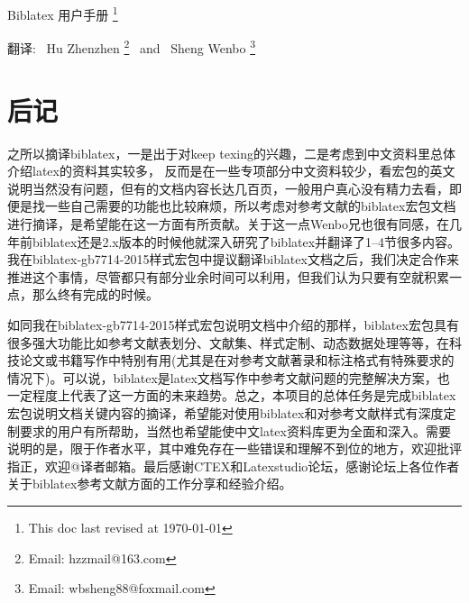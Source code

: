\documentclass{ltxdockit}[2011/03/25]
\begin{document}
\printtitlepage

\begin{trivlist}\item\relax
{\hfill\heiti{}Biblatex 用户手册
\footnote{This doc last revised at \today}\hfill\hspace*{1pt}}\par
{\hfill\fangsong{}翻译:~ Hu Zhenzhen \footnote{Email: hzzmail@163.com} ~and~ %
    	Sheng Wenbo \footnote{Email: wbsheng88@foxmail.com}\hfill\hspace*{2.5cm}}\par
{\hfill\kaiti{}\hfill\hspace*{0.5cm}}\par
\end{trivlist}
\renewcommand{\contentsname}{目录}
\renewcommand{\listtablename}{表格}
\tableofcontents
\listoftables











\printglossary[type=trans,style=longragged3colborder,nopostdot=true,nogroupskip]%

\section{后记}

\setlength{\parskip}{2mm}\setlength{\itemindent}{2em}

之所以摘译biblatex，一是出于对keep texing的兴趣，二是考虑到中文资料里总体介绍latex的资料其实较多，
反而是在一些专项部分中文资料较少，看宏包的英文说明当然没有问题，但有的文档内容长达几百页，一般用户真心没有精力去看，即便是找一些自己需要的功能也比较麻烦，所以考虑对参考文献的biblatex宏包文档进行摘译，是希望能在这一方面有所贡献。关于这一点Wenbo兄也很有同感，在几年前biblatex还是2.x版本的时候他就深入研究了biblatex并翻译了1--4节很多内容。我在biblatex-gb7714-2015样式宏包中提议翻译biblatex文档之后，我们决定合作来推进这个事情，尽管都只有部分业余时间可以利用，但我们认为只要有空就积累一点，那么终有完成的时候。

如同我在biblatex-gb7714-2015样式宏包说明文档中介绍的那样，biblatex宏包具有很多强大功能比如参考文献表划分、文献集、样式定制、动态数据处理等等，在科技论文或书籍写作中特别有用(尤其是在对参考文献著录和标注格式有特殊要求的情况下)。可以说，biblatex是latex文档写作中参考文献问题的完整解决方案，也一定程度上代表了这一方面的未来趋势。总之，本项目的总体任务是完成biblatex宏包说明文档关键内容的摘译，希望能对使用biblatex和对参考文献样式有深度定制要求的用户有所帮助，当然也希望能使中文latex资料库更为全面和深入。需要说明的是，限于作者水平，其中难免存在一些错误和理解不到位的地方，欢迎批评指正，欢迎@译者邮箱。最后感谢CTEX和Latexstudio论坛，感谢论坛上各位作者关于biblatex参考文献方面的工作分享和经验介绍。
\end{document}
